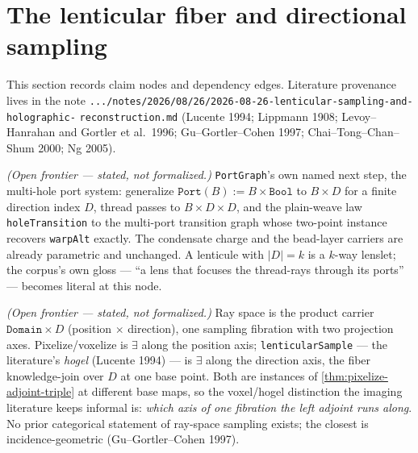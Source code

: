 \section{The lenticular fiber and directional sampling}

This section records claim nodes and dependency edges. Literature provenance lives in the
note \texttt{.../notes/2026/08/26/2026-08-26-lenticular-sampling-and-holographic-}
\texttt{reconstruction.md} (Lucente 1994; Lippmann 1908; Levoy--Hanrahan and Gortler et al.\
1996; Gu--Gortler--Cohen 1997; Chai--Tong--Chan--Shum 2000; Ng 2005).

\begin{proposition}[Directional ports]\label{thm:directional-port}\notready{}
\emph{(Open frontier --- stated, not formalized.)} \texttt{PortGraph}'s own named next
step, the multi-hole port system: generalize $\texttt{Port}(B) := B \times \texttt{Bool}$
to $B \times D$ for a finite direction index $D$, thread passes to $B \times D \times D$,
and the plain-weave law \texttt{holeTransition} to the multi-port transition graph whose
two-point instance recovers \texttt{warpAlt} exactly. The condensate charge and the
bead-layer carriers are already parametric and unchanged. A lenticule with $|D| = k$ is a
$k$-way lenslet; the corpus's own gloss --- ``a lens that focuses the thread-rays through
its ports'' --- becomes literal at this node.
\end{proposition}

\begin{theorem}[The lenticular fiber sample]\label{thm:lenticular-fiber-sample}\notready{}
\emph{(Open frontier --- stated, not formalized.)} Ray space is the product carrier
$\texttt{Domain} \times D$ (position $\times$ direction), one sampling fibration with two
projection axes. Pixelize/voxelize is $\exists$ along the position axis;
\texttt{lenticularSample} --- the literature's \emph{hogel} (Lucente 1994) --- is
$\exists$ along the direction axis, the fiber knowledge-join over $D$ at one base point.
Both are instances of \cref{thm:pixelize-adjoint-triple} at different base maps, so the
voxel/hogel distinction the imaging literature keeps informal is: \emph{which axis of one
fibration the left adjoint runs along}. No prior categorical statement of ray-space
sampling exists; the closest is incidence-geometric (Gu--Gortler--Cohen 1997).
\end{theorem}

